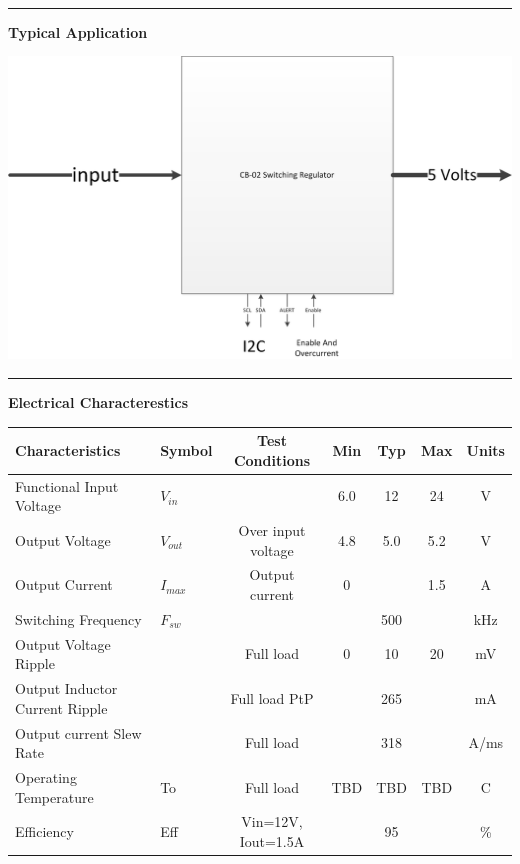\documentclass{article}
\begin{document}
\\
\hspace{0.3in}
\hrule
\hspace{0.3in}
\begin{center} 
\large{\textbf{Typical Application}}
\end{center}
\begin{center}
\includegraphics[width=6in]{CB02_block.png}
\end{center}
\hrule
\newpage
\large{\textbf{Electrical Characterestics}} \\
\begin{center}
\begin{tabular}{|l | l |c| c|c|c|c|}
\hline
Characteristics & Symbol &Test Conditions & Min & Typ & Max & Units \\ \hline
Functional Input Voltage& $V_{in}$& & 6.0&12&24&V \\ \hline 
Output Voltage & $V_{out}$ & Over input voltage& 4.8 & 5.0 & 5.2 & V \\ \hline
Output Current & $I_{max}$ &Output current& 0 & & 1.5 &A \\ \hline
Switching Frequency& $F_{sw}$ &  & &500&& kHz \\ \hline
Output Voltage Ripple && Full load & 0& 10&20&mV \\ \hline
Output Inductor Current Ripple && Full load  PtP& &265&& mA \\\hline
Output current Slew Rate&& Full load&&318&& A/ms \\ \hline
Operating Temperature & To& Full load & TBD&TBD&TBD& C \\ \hline
Efficiency & Eff &Vin=12V, Iout=1.5A& & 95 &  & \% \\\hline
\hline
\end{tabular}
\end{center}
\end{document}

